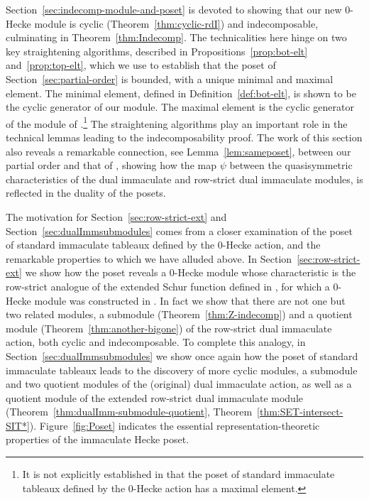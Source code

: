 \documentclass[12pt,letterpaper]{amsart}
\theoremstyle{definition}
\begin{document}
Section~\ref{sec:indecomp-module-and-poset} is devoted to showing that our new 0-Hecke module is cyclic (Theorem~\ref{thm:cyclic-rdI}) and indecomposable, culminating in Theorem~\ref{thm:Indecomp}.  The technicalities here hinge on two key straightening algorithms, described in Propositions~\ref{prop:bot-elt} and~\ref{prop:top-elt}, which we use to establish that the poset of Section~\ref{sec:partial-order} is bounded, with a unique minimal and maximal element.  The minimal element, defined in Definition~\ref{def:bot-elt}, is shown to be the cyclic generator of our module. The maximal element is the cyclic generator of the module of \cite{BBSSZ2015}.\footnote{It is not explicitly established in \cite{BBSSZ2015} that the poset of standard immaculate tableaux defined by the 0-Hecke action has a maximal element.} The straightening algorithms play an important role in the technical lemmas leading to the indecomposability proof.  The work of this section also reveals a remarkable connection, see  Lemma~\ref{lem:sameposet}, between our partial order and that of \cite{BBSSZ2015}, showing how the map $\psi$ between the quasisymmetric characteristics of the dual immaculate and row-strict dual immaculate modules, is reflected in the duality of the posets.

The motivation for Section~\ref{sec:row-strict-ext} and Section~\ref{sec:dualImmsubmodules} comes from  a closer examination of the poset of standard immaculate tableaux defined by the 0-Hecke action, and the remarkable properties to which we have alluded above.  In Section~\ref{sec:row-strict-ext} we show how the poset reveals a 0-Hecke module whose characteristic is the row-strict analogue of the extended Schur function defined in \cite{AS2019}, for which a 0-Hecke module was constructed in \cite{S2020}.   In fact we show that there are not one but two related modules, a submodule  (Theorem~\ref{thm:Z-indecomp}) and a quotient module (Theorem~\ref{thm:another-bigone}) of the row-strict dual immaculate action, both cyclic and indecomposable.  To complete this analogy,  in Section~\ref{sec:dualImmsubmodules} we show once again how the poset of standard immaculate tableaux leads to the discovery of  more cyclic modules, a submodule and two quotient modules of the (original) dual immaculate action, as well as a quotient module of the extended row-strict dual immaculate module (Theorem~\ref{thm:dualImm-submodule-quotient}, Theorem~\ref{thm:SET-intersect-SIT*}).     Figure~\ref{fig:Poset} indicates the essential representation-theoretic properties of the immaculate Hecke  poset.
\end{document}
